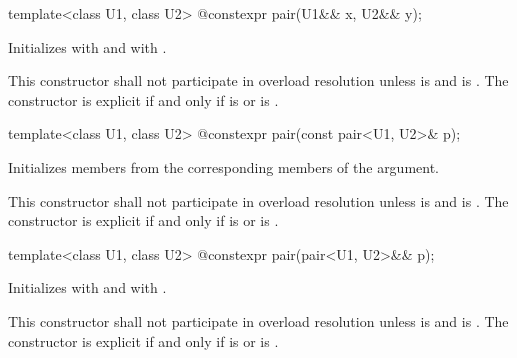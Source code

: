 %
\begin{itemdecl}
template<class U1, class U2> @\EXPLICIT@ constexpr pair(U1&& x, U2&& y);
\end{itemdecl}

\begin{itemdescr}
\pnum
\effects
Initializes  with
 and 
with .

\pnum
\remarks
This constructor shall not participate in overload resolution unless
 is  and
 is .
The constructor is explicit if and only if
 is  or
 is .
\end{itemdescr}

%
\begin{itemdecl}
template<class U1, class U2> @\EXPLICIT@ constexpr pair(const pair<U1, U2>& p);
\end{itemdecl}

\begin{itemdescr}
\pnum
\effects
Initializes members from the corresponding members of the argument.

\pnum
\remarks This constructor shall not participate in overload resolution unless
 is  and
 is .
The constructor is explicit if and only if
 is  or
 is .
\end{itemdescr}

%
\begin{itemdecl}
template<class U1, class U2> @\EXPLICIT@ constexpr pair(pair<U1, U2>&& p);
\end{itemdecl}

\begin{itemdescr}
\pnum
\effects
Initializes  with
and  with
.

\pnum
\remarks This constructor shall not participate in overload resolution unless
 is  and
 is .
The constructor is explicit if and only if
 is  or
 is .
\end{itemdescr}

